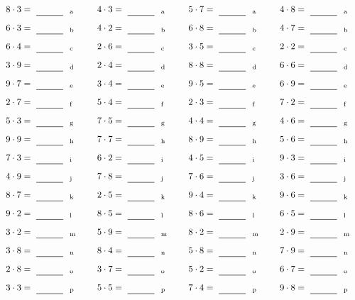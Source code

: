 \documentclass
[
  draft    = true,
  fontsize = 11pt,
  parskip  = half-
]
{scrartcl}
\begin{document}
\par\vfill\par
\begin{align*}
    \pline{8\cdot3}&=\rline{a}
  & \pline{4\cdot3}&=\rline{a}
  & \pline{5\cdot7}&=\rline{a}
  & \pline{4\cdot8}&=\rline{a} \\[1ex]
    \pline{6\cdot3}&=\rline{b}
  & \pline{4\cdot2}&=\rline{b}
  & \pline{6\cdot8}&=\rline{b}
  & \pline{4\cdot7}&=\rline{b} \\[1ex]
    \pline{6\cdot4}&=\rline{c}
  & \pline{2\cdot6}&=\rline{c}
  & \pline{3\cdot5}&=\rline{c}
  & \pline{2\cdot2}&=\rline{c} \\[1ex]
    \pline{3\cdot9}&=\rline{d}
  & \pline{2\cdot4}&=\rline{d}
  & \pline{8\cdot8}&=\rline{d}
  & \pline{6\cdot6}&=\rline{d} \\[1ex]
    \pline{9\cdot7}&=\rline{e}
  & \pline{3\cdot4}&=\rline{e}
  & \pline{9\cdot5}&=\rline{e}
  & \pline{6\cdot9}&=\rline{e} \\[1ex]
    \pline{2\cdot7}&=\rline{f}
  & \pline{5\cdot4}&=\rline{f}
  & \pline{2\cdot3}&=\rline{f}
  & \pline{7\cdot2}&=\rline{f} \\[1ex]
    \pline{5\cdot3}&=\rline{g}
  & \pline{7\cdot5}&=\rline{g}
  & \pline{4\cdot4}&=\rline{g}
  & \pline{4\cdot6}&=\rline{g} \\[1ex]
    \pline{9\cdot9}&=\rline{h}
  & \pline{7\cdot7}&=\rline{h}
  & \pline{8\cdot9}&=\rline{h}
  & \pline{5\cdot6}&=\rline{h} \\[1ex]
    \pline{7\cdot3}&=\rline{i}
  & \pline{6\cdot2}&=\rline{i}
  & \pline{4\cdot5}&=\rline{i}
  & \pline{9\cdot3}&=\rline{i} \\[1ex]
    \pline{4\cdot9}&=\rline{j}
  & \pline{7\cdot8}&=\rline{j}
  & \pline{7\cdot6}&=\rline{j}
  & \pline{3\cdot6}&=\rline{j} \\[1ex]
    \pline{8\cdot7}&=\rline{k}
  & \pline{2\cdot5}&=\rline{k}
  & \pline{9\cdot4}&=\rline{k}
  & \pline{9\cdot6}&=\rline{k} \\[1ex]
    \pline{9\cdot2}&=\rline{l}
  & \pline{8\cdot5}&=\rline{l}
  & \pline{8\cdot6}&=\rline{l}
  & \pline{6\cdot5}&=\rline{l} \\[1ex]
    \pline{3\cdot2}&=\rline{m}
  & \pline{5\cdot9}&=\rline{m}
  & \pline{8\cdot2}&=\rline{m}
  & \pline{2\cdot9}&=\rline{m} \\[1ex]
    \pline{3\cdot8}&=\rline{n}
  & \pline{8\cdot4}&=\rline{n}
  & \pline{5\cdot8}&=\rline{n}
  & \pline{7\cdot9}&=\rline{n} \\[1ex]
    \pline{2\cdot8}&=\rline{o}
  & \pline{3\cdot7}&=\rline{o}
  & \pline{5\cdot2}&=\rline{o}
  & \pline{6\cdot7}&=\rline{o} \\[1ex]
    \pline{3\cdot3}&=\rline{p}
  & \pline{5\cdot5}&=\rline{p}
  & \pline{7\cdot4}&=\rline{p}
  & \pline{9\cdot8}&=\rline{p}
\end{align*}
\end{document}
